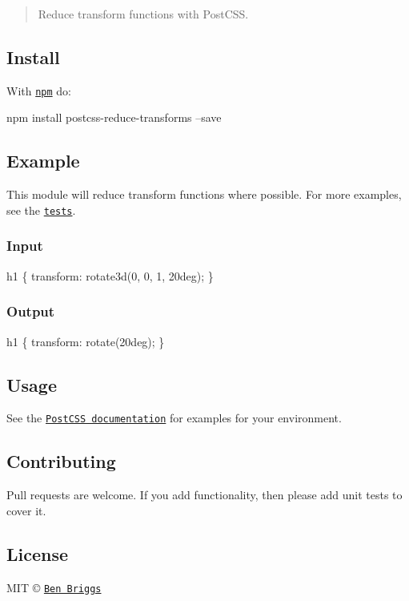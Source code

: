 \begin{quote}
Reduce transform functions with Post\+C\+SS. \end{quote}


\subsection*{Install}

With \href{https://npmjs.org/package/postcss-reduce-transforms}{\tt npm} do\+:


\begin{DoxyCode}
npm install postcss-reduce-transforms --save
\end{DoxyCode}


\subsection*{Example}

This module will reduce transform functions where possible. For more examples, see the \href{src/__tests__/index.js}{\tt tests}.

\subsubsection*{Input}


\begin{DoxyCode}
h1 \{
    transform: rotate3d(0, 0, 1, 20deg);
\}
\end{DoxyCode}


\subsubsection*{Output}


\begin{DoxyCode}
h1 \{
    transform: rotate(20deg);
\}
\end{DoxyCode}


\subsection*{Usage}

See the \href{https://github.com/postcss/postcss#usage}{\tt Post\+C\+SS documentation} for examples for your environment.

\subsection*{Contributing}

Pull requests are welcome. If you add functionality, then please add unit tests to cover it.

\subsection*{License}

M\+IT © \href{http://beneb.info}{\tt Ben Briggs} 